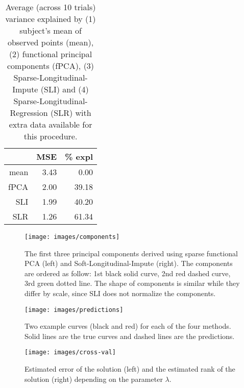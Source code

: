 \documentclass[preprint]{imsart}
\numberwithin{equation}{section}
\theoremstyle{plain}
\begin{document}
\begin{table}[ht]
\centering
\begin{tabular}{rrr}
  \hline
 & MSE & \% expl \\ 
  \hline
  mean & 3.43 & 0.00 \\ 
  fPCA & 2.00 & 39.18 \\ 
  SLI & 1.99 & 40.20 \\ 
  SLR & 1.26 & 61.34 \\ 
   \hline
\end{tabular}\label{tbl:simulations}
\caption{Average (across 10 trials) variance explained by (1) subject's mean of observed points (mean), (2) functional principal components (fPCA), (3) Sparse-Longitudinal-Impute (SLI) and (4) Sparse-Longitudinal-Regression (SLR) with extra data available for this procedure.}
\end{table}

\begin{figure}[h!]
  \texttt{[image: images/components]}
  \caption{The first three principal components derived using sparse functional PCA (left) and Soft-Longitudinal-Impute (right). The components are ordered as follow: 1st black solid curve, 2nd red dashed curve, 3rd green dotted line. The shape of components is similar while they differ by scale, since SLI does not normalize the components.}
  \label{fig:principal-components}
\end{figure}

\begin{figure}[h!]
  \texttt{[image: images/predictions]}
  \caption{Two example curves (black and red) for each of the four methods. Solid lines are the true curves and dashed lines are the predictions. }
  \label{fig:example-predictions}
\end{figure}

\begin{figure}[h!]
  \texttt{[image: images/cross-val]}
  \caption{Estimated error of the solution (left) and the estimated rank of the solution (right) depending on the parameter $\lambda$.}
  \label{fig:estimated-rank}
\end{figure}


\end{document}
